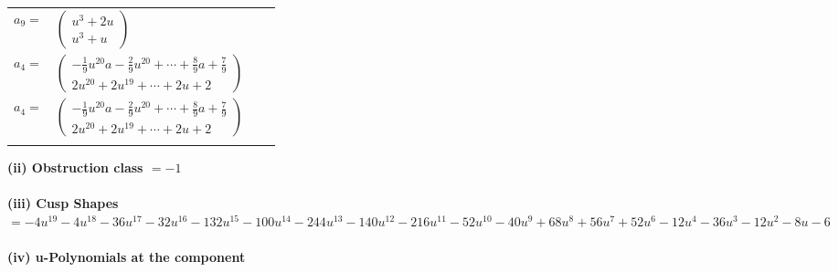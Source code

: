\documentclass[1p]{elsarticle_modified}
\theoremstyle{definition}
\begin{document}
\begin{tabular}{m{7pt} m{180pt} m{7pt} m{180pt} }
\flushright $a_{9}=$&$\begin{pmatrix}u^3+2 u\\u^3+u\end{pmatrix}$ \\
\flushright $a_{4}=$&$\begin{pmatrix}-\frac{1}{9} u^{20} a-\frac{2}{9} u^{20}+\cdots+\frac{8}{9} a+\frac{7}{9}\\2 u^{20}+2 u^{19}+\cdots+2 u+2\end{pmatrix}$\\ \flushright $a_{4}=$&$\begin{pmatrix}-\frac{1}{9} u^{20} a-\frac{2}{9} u^{20}+\cdots+\frac{8}{9} a+\frac{7}{9}\\2 u^{20}+2 u^{19}+\cdots+2 u+2\end{pmatrix}$\\&\end{tabular}
\flushleft \textbf{(ii) Obstruction class $= -1$}\\~\\
\flushleft \textbf{(iii) Cusp Shapes $= -4 u^{19}-4 u^{18}-36 u^{17}-32 u^{16}-132 u^{15}-100 u^{14}-244 u^{13}-140 u^{12}-216 u^{11}-52 u^{10}-40 u^9+68 u^8+56 u^7+52 u^6-12 u^4-36 u^3-12 u^2-8 u-6$}\\~\\
\newpage\renewcommand{\arraystretch}{1}
\flushleft \textbf{(iv) u-Polynomials at the component}\newline \\
\end{document}
